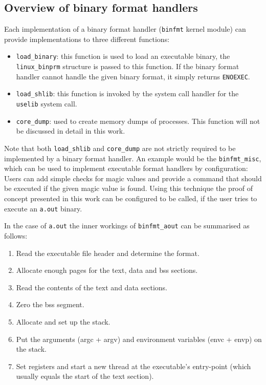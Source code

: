\documentclass[draft,final]{vutinfth} %
\begin{document}
\subsection{Overview of binary format handlers}

Each implementation of a binary format handler (\texttt{binfmt} kernel module) can provide implementations to three different functions:

\begin{itemize}
    \item \texttt{load\_binary}: this function is used to load an executable binary, the \texttt{linux\_binprm} structure is passed to this function. If the binary format handler cannot handle the given binary format, it simply returns \texttt{ENOEXEC}.
    \item \texttt{load\_shlib}: this function is invoked by the system call handler for the \texttt{uselib} system call.
    \item \texttt{core\_dump}: used to create memory dumps of processes. This function will not be discussed in detail in this work.
\end{itemize}

Note that both \texttt{load\_shlib} and \texttt{core\_dump} are not strictly required to be implemented by a binary format handler. An example would be the \texttt{binfmt\_misc}, which can be used to implement executable format handlers by configuration: Users can add simple checks for magic values and provide a command that should be executed if the given magic value is found. Using this technique the proof of concept presented in this work can be configured to be called, if the user tries to execute an \texttt{a.out} binary.

In the case of \texttt{a.out} the inner workings of \texttt{binfmt\_aout} can be summarised as follows:

\begin{enumerate}
    \item Read the executable file header and determine the format.
    \item Allocate enough pages for the text, data and bss sections.
    \item Read the contents of the text and data sections.
    \item Zero the bss segment.
    \item Allocate and set up the stack.
    \item Put the arguments (argc + argv) and environment variables (envc + envp) on the stack.
    \item Set registers and start a new thread at the executable's entry-point (which usually equals the start of the text section).
\end{enumerate}
\end{document}

